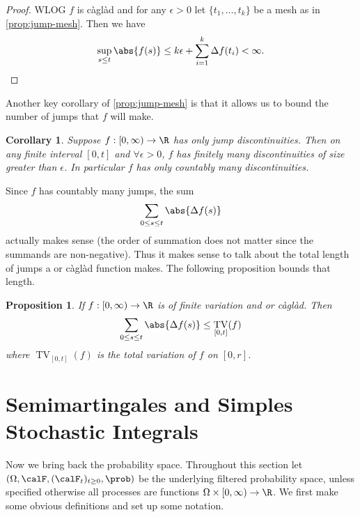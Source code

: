 \documentclass{scrreprt}
\theoremstyle{mydefn}
\newtheorem{prop}{Proposition}
\newtheorem{corollary}{Corollary}
\theoremstyle{remark}
\newcommand{\caglad}{c\`agl\`ad}
\newcommand{\filtspace}{(\Omega, \calF, (\calF_t)_{t \geq 0}, \prob)}
\DeclareMathOperator{\TV}{TV}
\begin{document}
\begin{proof}
	WLOG $f$ is \caglad{} and for any $\epsilon > 0$ let $\{t_1, \ldots, t_k\}$ be a mesh as in \vref{prop:jump-mesh}. Then we have
	\begin{equation}
		\sup_{s \leq t} \abs{f(s)} \leq k \epsilon + \sum_{i=1}^k \Delta f(t_i) < \infty.
	\end{equation}
\end{proof}

Another key corollary of \vref{prop:jump-mesh} is that it allows us to bound the number of jumps that $f$ will make.

\begin{corollary}
	\label{cor:countable-jumps}
	Suppose $f:[0, \infty) \to \R$ has only jump discontinuities. Then on any finite interval $[0, t]$ and $\forall \epsilon > 0$, $f$ has finitely many discontinuities of size greater than $\epsilon$. In particular $f$ has only countably many discontinuities.
\end{corollary}

Since $f$ has countably many jumps, the sum
\begin{equation}
	\sum_{0 \leq s \leq t} \abs{\Delta f(s)}
\end{equation}
actually makes sense (the order of summation does not matter since the summands are non-negative). Thus it makes sense to talk about the total length of jumps a \cadlag{} or \caglad{} function makes. The following proposition bounds that length.

\begin{prop}
	If $f: [0, \infty) \to \R$ is of finite variation and \cadlag{} or c\`agl\`ad. Then 
	\begin{equation}
		\sum_{0 \leq s \leq t} \abs{\Delta f(s)} \leq \TV_{[0, t]}(f)
	\end{equation}
	where $\TV_{[0, t]}(f)$ is the total variation of $f$ on $[0, r]$.
\end{prop}

\section{Semimartingales and Simples Stochastic Integrals}

Now we bring back the probability space. Throughout this section let $\filtspace$ be the underlying filtered probability space, unless specified otherwise all processes are functions $\Omega \times [0, \infty) \to \R$. We first make some obvious definitions and set up some notation.
\end{document}
